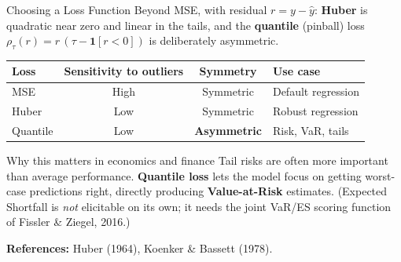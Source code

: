 \documentclass[aspectratio=169,11pt]{beamer}
\begin{document}
\begin{frame}{Choosing a Loss Function}
{\small Beyond MSE, with residual $r = y - \hat{y}$: \textbf{Huber} is quadratic near zero and linear in the tails, and the \textbf{quantile} (pinball) loss $\rho_\tau(r) = r\,(\tau - \mathbf{1}[r<0])$ is deliberately asymmetric.}

\vspace{0.15cm}
\begin{center}
{\footnotesize
\renewcommand{\arraystretch}{1.2}
\begin{tabular}{lccl}
\toprule
\textbf{Loss} & \textbf{Sensitivity to outliers} & \textbf{Symmetry} & \textbf{Use case} \\
\midrule
MSE      & High & Symmetric           & Default regression \\
Huber    & Low  & Symmetric           & Robust regression \\
Quantile & Low  & \textbf{Asymmetric} & Risk, VaR, tails \\
\bottomrule
\end{tabular}
}%
\end{center}

\vspace{0.2cm}
\begin{exampleblock}{Why this matters in economics and finance}
\small
Tail risks are often more important than average performance.
\textbf{Quantile loss} lets the model focus on getting worst-case predictions right,
directly producing \textbf{Value-at-Risk} estimates.
{\footnotesize (Expected Shortfall is \emph{not} elicitable on its own; it needs the joint VaR/ES scoring function of Fissler \& Ziegel, 2016.)}
\end{exampleblock}

\vspace{0.1cm}
{\footnotesize \textbf{References:} Huber (1964), Koenker \& Bassett (1978).}
\end{frame}
\end{document}
